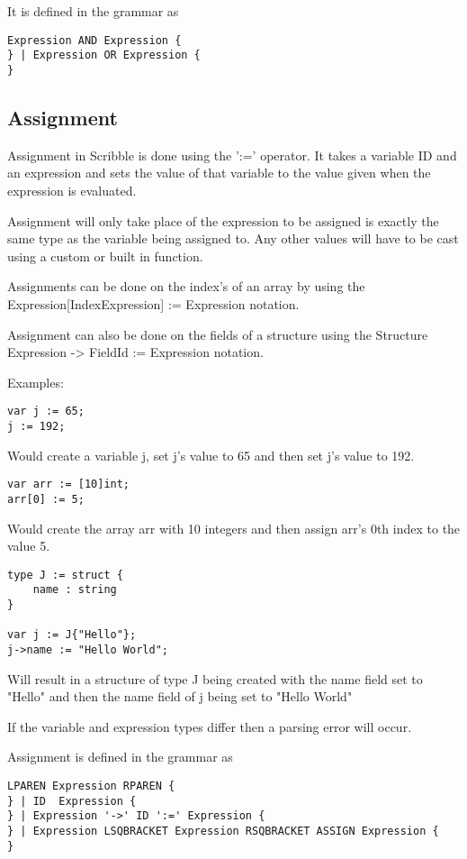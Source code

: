 \documentclass[]{final_report}
\begin{document}
It is defined in the grammar as
\begin{verbatim}
Expression AND Expression {
} | Expression OR Expression {
}
\end{verbatim}

\subsection{Assignment}

Assignment in Scribble is done using the ':=' operator. It takes a variable ID and an expression and sets the value of that variable to the value given when the expression is evaluated.

Assignment will only take place of the expression to be assigned is exactly the same type as the variable being assigned to. Any other values will have to be cast using a custom or built in function.

Assignments can be done on the index's of an array by using the Expression[IndexExpression] := Expression notation.

Assignment can also be done on the fields of a structure using the Structure Expression -> FieldId := Expression notation. 

Examples: \begin{verbatim}
var j := 65;
j := 192;
\end{verbatim}

Would create a variable j, set j's value to 65 and then set j's value to 192.

\begin{verbatim}
var arr := [10]int;
arr[0] := 5;
\end{verbatim}

Would create the array arr with 10 integers and then assign arr's 0th index to the value 5.

\begin{verbatim}
type J := struct {
	name : string
}

var j := J{"Hello"};
j->name := "Hello World";
\end{verbatim}
Will result in a structure of type J being created with the name field set to "Hello" and then the name field of j being set to "Hello World"

If the variable and expression types differ then a parsing error will occur.

Assignment is defined in the grammar as
\begin{verbatim}
LPAREN Expression RPAREN {
} | ID  Expression {
} | Expression '->' ID ':=' Expression {
} | Expression LSQBRACKET Expression RSQBRACKET ASSIGN Expression {
} 
\end{verbatim}
\end{document}
